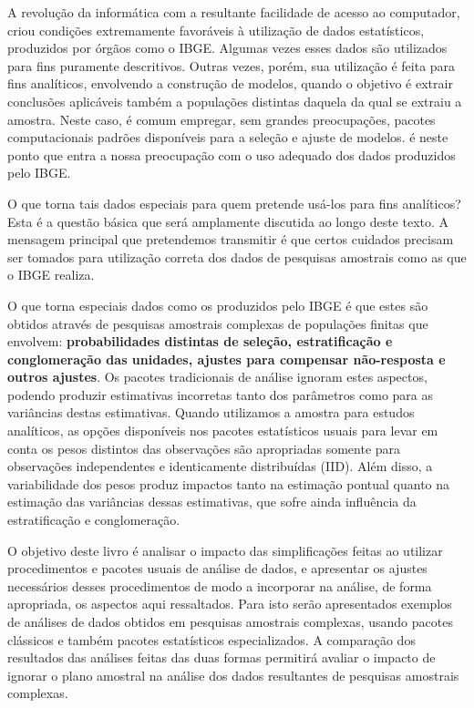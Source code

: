 \documentclass[]{book}
\begin{document}
A revolução da informática com a resultante facilidade de acesso ao
computador, criou condições extremamente favoráveis à utilização de
dados estatísticos, produzidos por órgãos como o IBGE. Algumas vezes
esses dados são utilizados para fins puramente descritivos. Outras
vezes, porém, sua utilização é feita para fins analíticos, envolvendo a
construção de modelos, quando o objetivo é extrair conclusões aplicáveis
também a populações distintas daquela da qual se extraiu a amostra.
Neste caso, é comum empregar, sem grandes preocupações, pacotes
computacionais padrões disponíveis para a seleção e ajuste de modelos. é
neste ponto que entra a nossa preocupação com o uso adequado dos dados
produzidos pelo IBGE.

O que torna tais dados especiais para quem pretende usá-los para fins
analíticos? Esta é a questão básica que será amplamente discutida ao
longo deste texto. A mensagem principal que pretendemos transmitir é que
certos cuidados precisam ser tomados para utilização correta dos dados
de pesquisas amostrais como as que o IBGE realiza.

O que torna especiais dados como os produzidos pelo IBGE é que estes são
obtidos através de pesquisas amostrais complexas de populações finitas
que envolvem: \textbf{probabilidades distintas de seleção,
estratificação e conglomeração das unidades, ajustes para compensar
não-resposta e outros ajustes}. Os pacotes tradicionais de análise
ignoram estes aspectos, podendo produzir estimativas incorretas tanto
dos parâmetros como para as variâncias destas estimativas. Quando
utilizamos a amostra para estudos analíticos, as opções disponíveis nos
pacotes estatísticos usuais para levar em conta os pesos distintos das
observações são apropriadas somente para observações independentes e
identicamente distribuídas (IID). Além disso, a variabilidade dos pesos
produz impactos tanto na estimação pontual quanto na estimação das
variâncias dessas estimativas, que sofre ainda influência da
estratificação e conglomeração.

O objetivo deste livro é analisar o impacto das simplificações feitas ao
utilizar procedimentos e pacotes usuais de análise de dados, e
apresentar os ajustes necessários desses procedimentos de modo a
incorporar na análise, de forma apropriada, os aspectos aqui
ressaltados. Para isto serão apresentados exemplos de análises de dados
obtidos em pesquisas amostrais complexas, usando pacotes clássicos e
também pacotes estatísticos especializados. A comparação dos resultados
das análises feitas das duas formas permitirá avaliar o impacto de
ignorar o plano amostral na análise dos dados resultantes de pesquisas
amostrais complexas.
\end{document}
